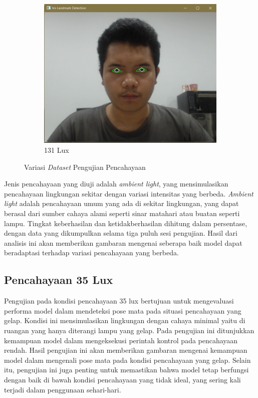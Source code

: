 \begin{figure}[H]
  \begin{subfigure}[b]{0.4\linewidth}
      \centering %
      \includegraphics[width=\linewidth]{gambar/bab4/131.png}
      \caption{131 Lux}
      \label{fig:imagec}
  \end{subfigure}
  \caption{Variasi \emph{Dataset} Pengujian Pencahayaan}
  \label{fig:Variasi Lux}
\end{figure}

Jenis pencahayaan yang diuji adalah \emph{ambient light}, yang mensimulasikan pencahayaan lingkungan sekitar dengan variasi intensitas yang berbeda. \emph{Ambient light} adalah pencahayaan umum yang ada di sekitar lingkungan, yang dapat berasal dari sumber cahaya alami seperti sinar matahari atau buatan seperti lampu. Tingkat keberhasilan dan ketidakberhasilan dihitung dalam persentase, dengan data yang dikumpulkan selama tiga puluh sesi pengujian. Hasil dari analisis ini akan memberikan gambaran mengenai seberapa baik model dapat beradaptasi terhadap variasi pencahayaan yang berbeda.

\subsection{Pencahayaan 35 Lux}

Pengujian pada kondisi pencahayaan 35 lux bertujuan untuk mengevaluasi performa model dalam mendeteksi pose mata pada situasi pencahayaan yang gelap. Kondisi ini mensimulasikan lingkungan dengan cahaya minimal yaitu di ruangan yang hanya diterangi lampu yang gelap. Pada pengujian ini ditunjukkan kemampuan model dalam mengeksekusi perintah kontrol pada pencahayaan rendah. Hasil pengujian ini akan memberikan gambaran mengenai kemampuan model dalam mengenali pose mata pada kondisi pencahayaan yang gelap. Selain itu, pengujian ini juga penting untuk memastikan bahwa model tetap berfungsi dengan baik di bawah kondisi pencahayaan yang tidak ideal, yang sering kali terjadi dalam penggunaan sehari-hari.

